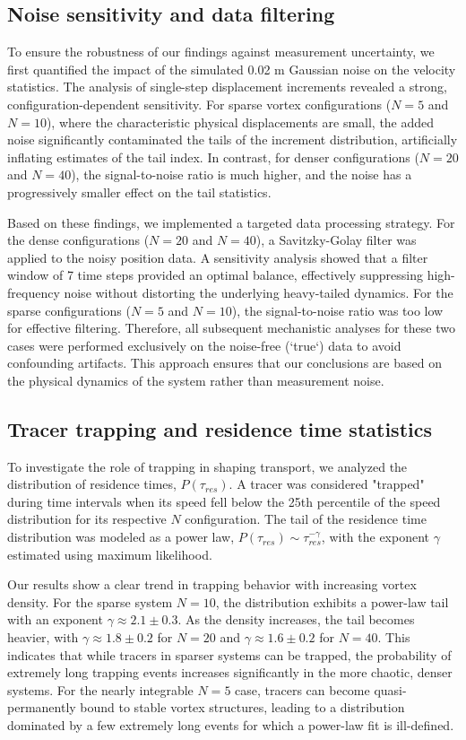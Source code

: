 \documentclass[]{article}
\begin{document}
\subsection{Noise sensitivity and data filtering}

To ensure the robustness of our findings against measurement uncertainty, we first quantified the impact of the simulated 0.02 m Gaussian noise on the velocity statistics. The analysis of single-step displacement increments revealed a strong, configuration-dependent sensitivity. For sparse vortex configurations ($N=5$ and $N=10$), where the characteristic physical displacements are small, the added noise significantly contaminated the tails of the increment distribution, artificially inflating estimates of the tail index. In contrast, for denser configurations ($N=20$ and $N=40$), the signal-to-noise ratio is much higher, and the noise has a progressively smaller effect on the tail statistics.

Based on these findings, we implemented a targeted data processing strategy. For the dense configurations ($N=20$ and $N=40$), a Savitzky-Golay filter was applied to the noisy position data. A sensitivity analysis showed that a filter window of 7 time steps provided an optimal balance, effectively suppressing high-frequency noise without distorting the underlying heavy-tailed dynamics. For the sparse configurations ($N=5$ and $N=10$), the signal-to-noise ratio was too low for effective filtering. Therefore, all subsequent mechanistic analyses for these two cases were performed exclusively on the noise-free (`true`) data to avoid confounding artifacts. This approach ensures that our conclusions are based on the physical dynamics of the system rather than measurement noise.

\subsection{Tracer trapping and residence time statistics}

To investigate the role of trapping in shaping transport, we analyzed the distribution of residence times, $P(\tau_{res})$. A tracer was considered "trapped" during time intervals when its speed fell below the 25th percentile of the speed distribution for its respective $N$ configuration. The tail of the residence time distribution was modeled as a power law, $P(\tau_{res}) \sim \tau_{res}^{-\gamma}$, with the exponent $\gamma$ estimated using maximum likelihood.

Our results show a clear trend in trapping behavior with increasing vortex density. For the sparse system $N=10$, the distribution exhibits a power-law tail with an exponent $\gamma \approx 2.1 \pm 0.3$. As the density increases, the tail becomes heavier, with $\gamma \approx 1.8 \pm 0.2$ for $N=20$ and $\gamma \approx 1.6 \pm 0.2$ for $N=40$. This indicates that while tracers in sparser systems can be trapped, the probability of extremely long trapping events increases significantly in the more chaotic, denser systems. For the nearly integrable $N=5$ case, tracers can become quasi-permanently bound to stable vortex structures, leading to a distribution dominated by a few extremely long events for which a power-law fit is ill-defined.
\end{document}
